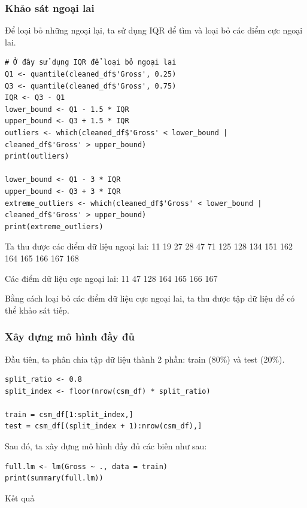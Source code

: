 \subsubsection{Khảo sát ngoại lai}

Để loại bỏ những ngoại lại, ta sử dụng IQR để tìm và loại bỏ các điểm cực ngoại lai.

\begin{lstlisting}
# Ở đây sử dụng IQR để loại bỏ ngoại lai
Q1 <- quantile(cleaned_df$'Gross', 0.25)
Q3 <- quantile(cleaned_df$'Gross', 0.75)
IQR <- Q3 - Q1
lower_bound <- Q1 - 1.5 * IQR
upper_bound <- Q3 + 1.5 * IQR
outliers <- which(cleaned_df$'Gross' < lower_bound | cleaned_df$'Gross' > upper_bound)
print(outliers)

lower_bound <- Q1 - 3 * IQR
upper_bound <- Q3 + 3 * IQR
extreme_outliers <- which(cleaned_df$'Gross' < lower_bound | cleaned_df$'Gross' > upper_bound)
print(extreme_outliers)
\end{lstlisting}

Ta thu được các điểm dữ liệu ngoại lai: 11  19  27  28  47  71 125 128 134 151 162 164 165 166 167 168

Các điểm dữ liệu cực ngoại lai: 11  47 128 164 165 166 167

Bằng cách loại bỏ các điểm dữ liệu cực ngoại lai, ta thu được tập dữ liệu để có thể khảo sát tiếp.


\subsubsection{Xây dựng mô hình đầy đủ}

Đầu tiên, ta phân chia tập dữ liệu thành 2 phần: train (80\%) và test (20\%).
\begin{lstlisting}
split_ratio <- 0.8
split_index <- floor(nrow(csm_df) * split_ratio)

train = csm_df[1:split_index,]
test = csm_df[(split_index + 1):nrow(csm_df),]
\end{lstlisting}

Sau đó, ta xây dựng mô hình đầy đủ các biến như sau:

\begin{lstlisting}
full.lm <- lm(Gross ~ ., data = train)
print(summary(full.lm))
\end{lstlisting}

Kết quả

